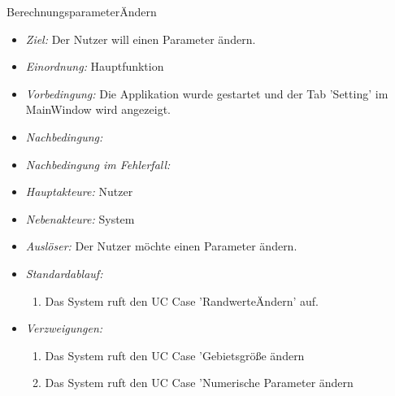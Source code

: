 Berechnungsparameter\"Andern
  \begin{itemize}
  \item \textit{Ziel:} Der Nutzer will einen Parameter \"andern.
  \item \textit{Einordnung:} Hauptfunktion
  \item \textit{Vorbedingung:} Die Applikation wurde gestartet und der Tab 'Setting' im MainWindow wird angezeigt.
  \item \textit{Nachbedingung:} 
  \item \textit{Nachbedingung im Fehlerfall:} 
  \item \textit{Hauptakteure:} Nutzer
  \item \textit{Nebenakteure:} System
  \item \textit{Ausl\"oser:} Der Nutzer m\"ochte einen Parameter \"andern.
  \item \textit{Standardablauf:}
    \begin{enumerate}[label=(\arabic*)]
    \item Das System ruft den UC Case 'Randwerte\"Andern' auf.
  \end{enumerate}
  \item \textit{Verzweigungen:}
    \begin{enumerate}[label=(1\alph*)]
\item Das System ruft den UC Case 'Gebietsgr\"o\ss e \"andern
\item Das System ruft den UC Case 'Numerische Parameter \"andern
    \end{enumerate}
  \end{itemize}